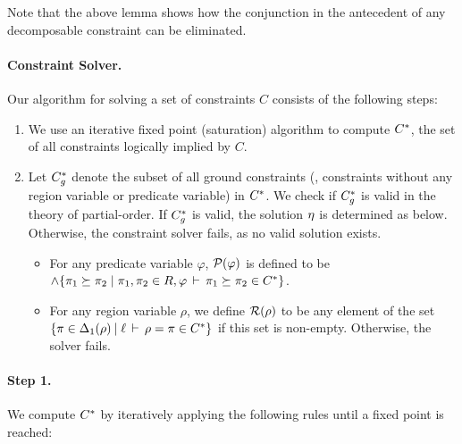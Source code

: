 Note that the above lemma shows how the conjunction in the antecedent of
any decomposable constraint can be eliminated.

\paragraph{Constraint Solver.}
Our algorithm for solving a set of constraints $C$ consists of the following steps:
\begin{enumerate}
\item We use an iterative fixed point (saturation) algorithm to compute
${C}^*$, the set of all constraints logically implied by $C$.
\item Let ${C}^*_g$ denote the subset of all ground constraints
(\ie, constraints without any region variable or predicate variable)
in ${C}^*$. We check if ${C}^*_g$ is valid in the theory of
partial-order. If ${C}^*_g$ is valid, the solution $\eta$ is determined
as below. Otherwise, the constraint solver fails, as no valid solution exists.
\begin{itemize}
\item For any predicate variable $\varphi$, $\mathcal{P}(\varphi)$ is defined
to be $\wedge \{ \pi_1 \succeq \pi_2 \;|\; \pi_1, \pi_2 \in R, \varphi\,\vdash\,\pi_1 \succeq \pi_2 \in {C}^* \}$.
\item For any region variable $\rho$, we define $\mathcal{R}(\rho)$ to be any element of the
set $\{ \pi \in {\Delta_1}(\rho) \:|\; \ell\,\vdash\,\rho = \pi \in {C}^* \}$ 
if this set is non-empty.
Otherwise, the solver fails.
\end{itemize}
\end{enumerate}

\paragraph{Step 1.}
We compute ${C}^*$ by iteratively applying the following rules until a fixed
point is reached:

